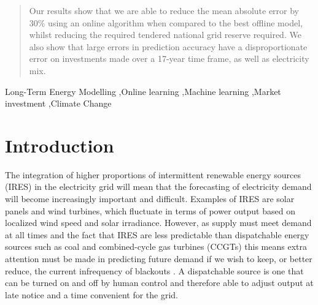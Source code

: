 \documentclass[final,3p,times,twocolumn,numbers]{elsarticle}
\begin{document}
\begin{frontmatter}
\begin{abstract}

Our results show that we are able to reduce the mean absolute error by 30\% using an online algorithm when compared to the best offline model, whilst reducing the required tendered national grid reserve required. We also show that large errors in prediction accuracy have a disproportionate error on investments made over a 17-year time frame, as well as electricity mix.


\end{abstract}



%
%

\begin{keyword}
Long-Term Energy Modelling \sep Online learning \sep Machine learning \sep Market investment \sep Climate Change


\end{keyword}

\end{frontmatter}


\section{Introduction}
\label{sec:intro}

The integration of higher proportions of intermittent renewable energy sources (IRES) in the electricity grid will mean that the forecasting of electricity demand will become increasingly important and difficult. Examples of IRES are solar panels and wind turbines, which fluctuate in terms of power output based on localized wind speed and solar irradiance. However, as supply must meet demand at all times and the fact that IRES are less predictable than dispatchable energy sources such as coal and combined-cycle gas turbines (CCGTs) this means extra attention must be made in predicting future demand if we wish to keep, or better reduce, the current infrequency of blackouts \cite{Lu1993}. A dispatchable source is one that can be turned on and off by human control and therefore able to adjust output at late notice and a time convenient for the grid.
\end{document}
